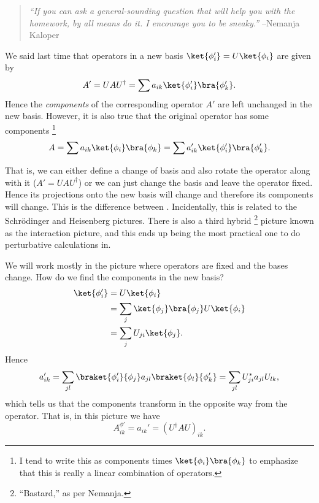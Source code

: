 \begin{quote}
    \textit{``If you can ask a general-sounding question that will help you with the homework, by all means do it. I encourage you to be sneaky.''} --Nemanja Kaloper
\end{quote}


We said last time that operators in a new basis $\ket{\phi'_i} = U\ket{\phi_i}$ are given by
\begin{equation}
    A'= UAU^\dagger=\sum a_{ik} \ket{\phi_i'}\bra{\phi_k'}.
\end{equation}
Hence the \emph{components} of the corresponding operator $A'$ are left unchanged in the new basis. However, it is also true that the original operator has some components%
    \footnote{I tend to write this as components times $\ket{\phi_i}\bra{\phi_k}$ to emphasize that this is really a linear combination of operators.}
\begin{equation}
    A=\sum a_{ik}\ket{\phi_i} \bra{\phi_k} = \sum a_{ik}'\ket{\phi_i'}  \bra{\phi_k'}.
\end{equation}

That is, we can either define a change of basis and also rotate the operator along with it ($A'=UAU^\dagger$) or we can just change the basis and leave the operator fixed. Hence its projections onto the new basis will change and therefore its components will change. This is the difference between . Incidentally, this is related to the Schr\"odinger and Heisenberg pictures. There is also a third hybrid%
    \footnote{``Bastard,'' as per Nemanja.}
picture known as the interaction picture, and this ends up being the most practical one to do perturbative calculations in.

We will work mostly in the picture where operators are fixed and the bases change. How do we find the components in the new basis?
\begin{align}
    \ket{\phi_i'} &= U \ket{\phi_i}\\
        &= \sum_j \ket{\phi_j}\bra{\phi_j}U \ket{\phi_i}\\
        &= \sum_j U_{ji} \ket{\phi_j}.
\end{align}
Hence
\begin{equation}
    a_{ik}'=\sum_{jl} \braket{\phi_i'}{\phi_j} a_{jl} \braket{\phi_l}{\phi_k'} = \sum_{jl} U_{ji}^* a_{jl} U_{lk},
\end{equation}
which tells us that the components transform in the opposite way from the operator. That is, in this picture we have
\begin{equation}
    A^{\phi'}_{ik} = a_{ik}'=(U^\dagger A U)_{ik}.
\end{equation}

